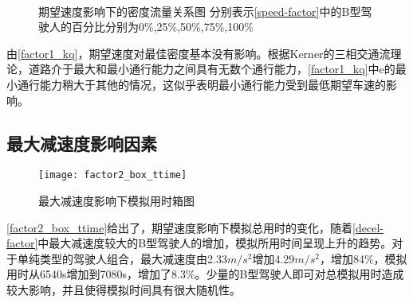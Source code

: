 \begin{figure}[H]%
\centering
{}%
\\%
%
\caption[A set of four sub-floats.]{期望速度影响下的密度流量关系图
分别表示\autoref{speed-factor}中的B型驾驶人的百分比分别为0\%,25\%,50\%,75\%,100\%}%
\label{factor1_kq}%
\end{figure}

由\autoref{factor1_kq}，期望速度对最佳密度基本没有影响。根据Kerner的三相交通流理论，道路介于最大和最小通行能力之间具有无数个通行能力，\autoref{factor1_kq}中e的最小通行能力稍大于其他的情况，这似乎表明最小通行能力受到最低期望车速的影响。


\subsection{最大减速度影响因素}

\begin{figure}[H]
\begin{center}
\texttt{[image: factor2\_box\_ttime]}
\caption{最大减速度影响下模拟用时箱图}
\label{factor2_box_ttime}
\end{center}
\end{figure}

\autoref{factor2_box_ttime}给出了，期望速度影响下模拟总用时的变化，随着\autoref{decel-factor}中最大减速度较大的B型驾驶人的增加，模拟所用时间呈现上升的趋势。对于单纯类型的驾驶人组合，最大减速度由2.33$m/s^2$增加4.29$m/s^2$，增加84\%，模拟用时从6540s增加到7080s，增加了8.3\%。少量的B型驾驶人即可对总模拟用时造成较大影响，并且使得模拟时间具有很大随机性。


